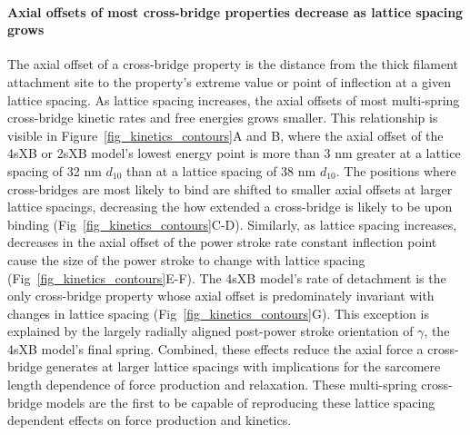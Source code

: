 \documentclass[10pt]{article}
\begin{document}
\paragraph{Axial offsets of most cross-bridge properties decrease as lattice spacing grows} %
The axial offset of a cross-bridge property is the distance from the thick filament attachment site to the property's extreme value or point of inflection at a given lattice spacing. 
As lattice spacing increases, the axial offsets of most multi-spring cross-bridge kinetic rates and free energies grows smaller.
This relationship is visible in Figure~\ref{fig_kinetics_contours}A and B, where the axial offset of the 4sXB or 2sXB model's lowest energy point is more than 3 nm greater at a lattice spacing of 32 nm $d_{10}$ than at a lattice spacing of 38 nm $d_{10}$. 
The positions where cross-bridges are most likely to bind are shifted to smaller axial offsets at larger lattice spacings, decreasing the how extended a cross-bridge is likely to be upon binding (Fig~\ref{fig_kinetics_contours}C-D). 
Similarly, as lattice spacing increases, decreases in the axial offset of the power stroke rate constant inflection point cause the size of the power stroke to change with lattice spacing (Fig~\ref{fig_kinetics_contours}E-F).
The 4sXB model's rate of detachment is the only cross-bridge property whose axial offset is predominately invariant with changes in lattice spacing (Fig~\ref{fig_kinetics_contours}G). 
This exception is explained by the largely radially aligned post-power stroke orientation of $\gamma$, the 4sXB model's final spring. 
Combined, these effects reduce the axial force a cross-bridge generates at larger lattice spacings with implications for the sarcomere length dependence of force production and relaxation. 
These multi-spring cross-bridge models are the first to be capable of reproducing these lattice spacing dependent effects on force production and kinetics.
\end{document}
